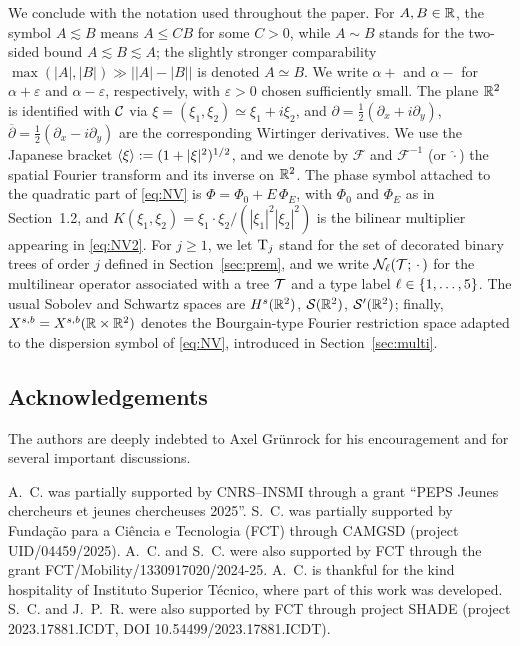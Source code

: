 \bigskip

We conclude with the notation used throughout the paper. For $A,B\in\mathbb{R}$, the symbol $A\lesssim B$ means $A\le C B$ for some $C>0$, while $A\sim B$ stands for the two-sided bound $A\lesssim B\lesssim A$; the slightly stronger comparability $\max(|A|,|B|)\gg\big||A|-|B|\big|$ is denoted $A\simeq B$. We write $\alpha+$ and $\alpha-$ for $\alpha+\varepsilon$ and $\alpha-\varepsilon$, respectively, with $\varepsilon>0$ chosen sufficiently small. The plane $\mathbb{R}^2$ is identified with $\mathcal{C}$ via $\xi=(\xi_1,\xi_2)\simeq\xi_1+i\xi_2$, and $\partial=\tfrac12(\partial_x+i\partial_y)$, $\overline\partial=\tfrac12(\partial_x-i\partial_y)$ are the corresponding Wirtinger derivatives. We use the Japanese bracket $\langle \xi \rangle:=(1+|\xi|^2)^{1/2}$, and we denote by $\mathcal{F}$ and $\mathcal{F}^{-1}$ (or $\widehat{\cdot}$) the spatial Fourier transform and its inverse on $\mathbb{R}^2$. The phase symbol attached to the quadratic part of \eqref{eq:NV} is $\Phi=\Phi_0+E\,\Phi_E$, with $\Phi_0$ and $\Phi_E$ as in Section~1.2, and $K(\xi_1,\xi_2)=\xi_1\cdot\xi_2/(|\xi_1|^2|\xi_2|^2)$ is the bilinear multiplier appearing in \eqref{eq:NV2}. For $j\ge 1$, we let $\mathrm{T}_j$ stand for the set of decorated binary trees of order $j$ defined in Section~\ref{sec:prem}, and we write $\mathcal{N}_\ell(\mathcal{T};\,\cdot\,)$ for the multilinear operator associated with a tree $\mathcal{T}$ and a type label $\ell\in\{1,\dots,5\}$. The usual Sobolev and Schwartz spaces are $H^s(\mathbb{R}^2)$, $\mathcal{S}(\mathbb{R}^2)$, $\mathcal{S}'(\mathbb{R}^2)$; finally, $X^{s,b}=X^{s,b}(\mathbb{R}\times\mathbb{R}^2)$ denotes the Bourgain-type Fourier restriction space adapted to the dispersion symbol of \eqref{eq:NV}, introduced in Section~\ref{sec:multi}.


\subsection{Acknowledgements}

The authors are deeply indebted to Axel Gr\"unrock for his encouragement and for several important discussions.

\medskip

A.~C. was partially supported by CNRS--INSMI through a grant ``PEPS Jeunes chercheurs et jeunes chercheuses 2025''. S.~C. was partially supported by Funda\c{c}\~ao para a Ci\^encia e Tecnologia (FCT) through CAMGSD (project UID/04459/2025). A.~C. and S.~C. were also supported by FCT through the grant FCT/Mobility/1330917020/2024-25. A.~C. is thankful for the kind hospitality of Instituto Superior T\'ecnico, where part of this work was developed. S.~C. and J.~P.~R. were also supported by FCT through project SHADE (project 2023.17881.ICDT, DOI 10.54499/2023.17881.ICDT).
